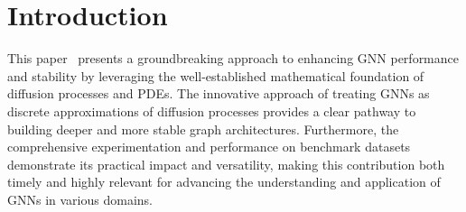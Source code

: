 \documentclass[12pt]{article}
\begin{document}
\section{Introduction}
This paper~\cite{9095246} presents a groundbreaking approach to enhancing GNN performance and stability by leveraging the well-established mathematical foundation of diffusion processes and PDEs. The innovative approach of treating GNNs as discrete approximations of diffusion processes provides a clear pathway to building deeper and more stable graph architectures. Furthermore, the comprehensive experimentation and performance on benchmark datasets demonstrate its practical impact and versatility, making this contribution both timely and highly relevant for advancing the understanding and application of GNNs in various domains.



\end{document}
